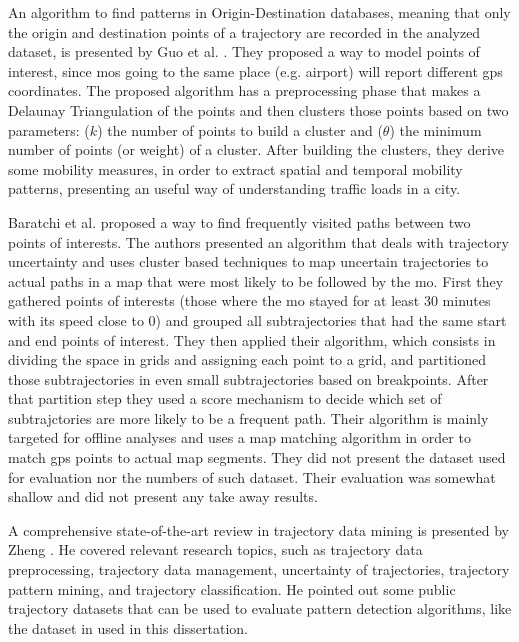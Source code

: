 An algorithm to find patterns in Origin-Destination databases, meaning that only the origin and destination points of a
trajectory are recorded in the analyzed dataset, is presented by Guo et al. \citep{discovering_orig_dest}. They proposed
a way to model points of interest, since \acp{mo} going to the same place (e.g. airport) will report different \ac{gps}
coordinates. The proposed algorithm has a preprocessing phase that makes a Delaunay Triangulation of the points and then
clusters those points based on two parameters: ($k$) the number of points to build a cluster and ($\theta$) the minimum
number of points (or weight) of a cluster. After building the clusters, they derive some mobility measures, in order to
extract spatial and temporal mobility patterns, presenting an useful way of understanding traffic loads in a city.

Baratchi et al. proposed a way to find frequently visited paths between two points of interests. The authors presented
an algorithm that deals with trajectory uncertainty and uses cluster based techniques to map uncertain trajectories to
actual paths in a map that were most likely to be followed by the \ac{mo}. First they gathered points of interests
(those where the \ac{mo} stayed for at least 30 minutes with its speed close to 0) and grouped all subtrajectories that
had the same start and end points of interest. They then applied their algorithm, which consists in dividing the space
in grids and assigning each point to a grid, and partitioned those subtrajectories in even small subtrajectories based
on breakpoints.  After that partition step they used a score mechanism to decide which set of subtrajctories are more
likely to be a frequent path. Their algorithm is mainly targeted for offline analyses and uses a map matching algorithm
in order to match \ac{gps} points to actual map segments. They did not present the dataset used for evaluation nor the
numbers of such dataset. Their evaluation was somewhat shallow and did not present any take away results.

A comprehensive state-of-the-art review in trajectory data mining is presented by Zheng \citep{survey}. He covered
relevant research topics, such as trajectory data preprocessing, trajectory data management, uncertainty of
trajectories, trajectory pattern mining, and trajectory classification. He pointed out some public trajectory datasets
that can be used to evaluate pattern detection algorithms, like the dataset in \citep{tdrive} used in this dissertation.


